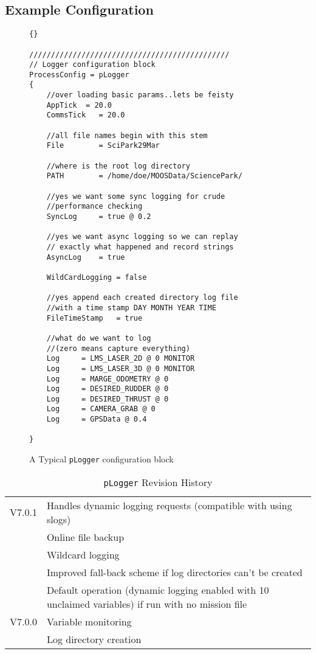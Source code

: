 \documentclass[a4paper,10pt]{article}
\newcommand{\Code}[1]{\texttt{#1} }
\newcommand{\code}[1]{\Code{#1} }
\begin{document}
\subsection{Example Configuration}
\begin{figure}[ht!]\label{fig:LoggerConfig}
\begin{lstlisting}[]{}

//////////////////////////////////////////////
// Logger configuration block
ProcessConfig = pLogger
{
    //over loading basic params..lets be feisty
    AppTick  = 20.0
    CommsTick   = 20.0

    //all file names begin with this stem
    File        = SciPark29Mar

    //where is the root log directory
    PATH        = /home/doe/MOOSData/SciencePark/

    //yes we want some sync logging for crude
    //performance checking
    SyncLog     = true @ 0.2

    //yes we want async logging so we can replay
    // exactly what happened and record strings
    AsyncLog    = true

    WildCardLogging = false

    //yes append each created directory log file
    //with a time stamp DAY MONTH YEAR TIME
    FileTimeStamp   = true

    //what do we want to log
    //(zero means capture everything)
    Log     = LMS_LASER_2D @ 0 MONITOR
    Log     = LMS_LASER_3D @ 0 MONITOR
    Log     = MARGE_ODOMETRY @ 0
    Log     = DESIRED_RUDDER @ 0
    Log     = DESIRED_THRUST @ 0
    Log     = CAMERA_GRAB @ 0
    Log     = GPSData @ 0.4

}

\end{lstlisting}
\caption{A Typical \code{pLogger} configuration block}
\end{figure}


\begin{table}[ht!]
  \centering
  \caption{\code{pLogger} Revision History}\label{Tab:RevisionHistory}
  \begin{tabular}{|l|p{10cm}|}
    \hline
    V7.0.1 & Handles dynamic logging requests (compatible with using slogs)\\
     & Online file backup \\
     & Wildcard logging \\
     & Improved fall-back scheme if log directories can't be created \\
     & Default operation (dynamic logging enabled with 10 unclaimed variables) if run with no mission file\\
    V7.0.0 & Variable monitoring \\
     & Log directory creation \\
    \hline
  \end{tabular}
\end{table}
\end{document}
